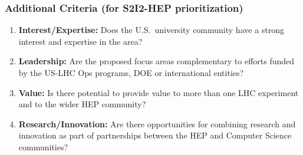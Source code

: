\begin{frame}
\frametitle{Additional Criteria (for S2I2-HEP prioritization)}

\begin{enumerate}
\item {\bf Interest/Expertise:} Does the U.S.\ university community have a strong interest and expertise in the area?
\item {\bf Leadership:} Are the proposed focus areas complementary to efforts funded by the US-LHC Ops programs, DOE or international entities?
\item {\bf Value:} Is there potential to provide value to more than one LHC experiment and to the wider HEP community?
\item {\bf Research/Innovation:} Are there opportunities for combining research and innovation as part of partnerships between the HEP and Computer Science communities?
\end{enumerate}

\end{frame}


